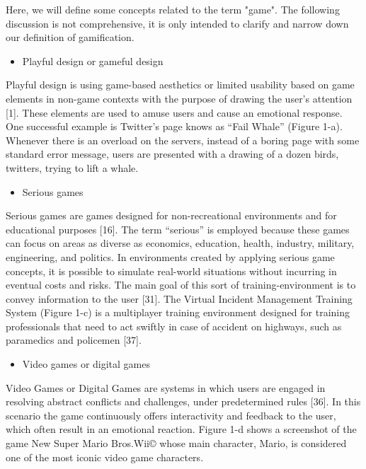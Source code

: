 Here, we will define some concepts related to the term "game". The following discussion is not comprehensive, it is only intended to clarify and narrow down our definition of gamification. 

\begin{itemize}
\item Playful design or gameful design
\end{itemize}
Playful design is using game-based aesthetics or limited usability
based on game elements in non-game contexts with the purpose of
drawing the user's attention [1]. These elements are used to amuse
users and cause an emotional response. One successful example is
Twitter’s page knows as “Fail Whale” (Figure 1-a). Whenever
there is an overload on the servers, instead of a boring page with
some standard error message, users are presented with a drawing of
a dozen birds, twitters, trying to lift a whale.

\begin{itemize}
\item Serious games
\end{itemize}
Serious games are games designed for non-recreational
environments and for educational purposes [16]. The term
“serious” is employed because these games can focus on areas as
diverse as economics, education, health, industry, military,
engineering, and politics. In environments created by applying
serious game concepts, it is possible to simulate real-world
situations without incurring in eventual costs and risks. The main
goal of this sort of training-environment is to convey information
to the user [31]. The Virtual Incident Management Training System
(Figure 1-c) is a multiplayer training environment designed for
training professionals that need to act swiftly in case of accident on
highways, such as paramedics and policemen [37].

\begin{itemize}
\item Video games or digital games
\end{itemize}
Video Games or Digital Games are systems in which users are
engaged in resolving abstract conflicts and challenges, under
predetermined rules [36]. In this scenario the game continuously
offers interactivity and feedback to the user, which often result in
an emotional reaction. Figure 1-d shows a screenshot of the game
New Super Mario Bros.Wii© whose main character, Mario, is
considered one of the most iconic video game characters.

